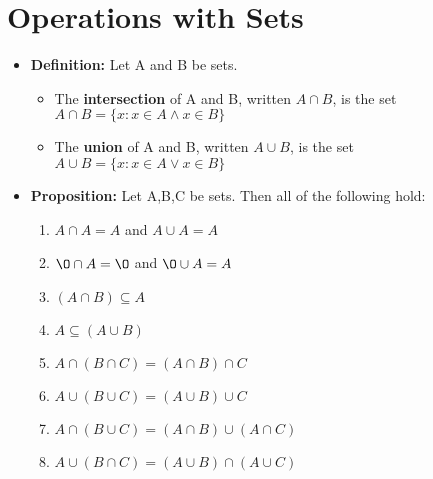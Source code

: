 \documentclass{report}
\begin{document}
	\section{Operations with Sets}
		\begin{itemize}\addtolength{\leftskip}{2em}
			\item \textbf{Definition:} Let A and B be sets.
			\begin{itemize}\addtolength{\leftskip}{4em}
				\item The \textbf{intersection} of A and B, written $A\cap B$, is the set
					\subsubitem $A\cap B=\{x:x\in A\wedge x\in B\}$
				\item The \textbf{union} of A and B, written $A\cup B$, is the set
					\subsubitem $A\cup B=\{x:x\in A\vee x\in B\}$
			\end{itemize}
			\item \textbf{Proposition:} Let A,B,C be sets. Then all of the following hold:
			\begin{enumerate}\addtolength{\leftskip}{4em}
				\item $A\cap A=A$ and $A\cup A=A$
				\item $\O \cap A = \O$ and $\O \cup A = A$
				\item $(A\cap B)\subseteq A$
				\item $A\subseteq (A\cup B)$
				\item $A\cap(B\cap C)=(A\cap B)\cap C$
				\item $A\cup(B\cup C)=(A\cup B)\cup C$
				\item $A\cap (B\cup C)=(A\cap B)\cup (A\cap C)$
				\item $A\cup (B\cap C)=(A\cup B)\cap(A\cup C)$
			\end{enumerate}
		\end{itemize}
\end{document}
